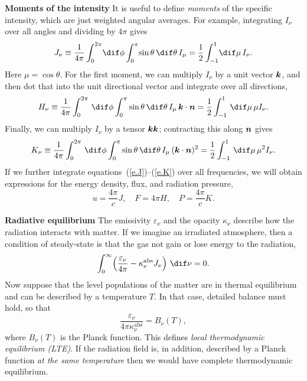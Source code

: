 \textbf{Moments of the intensity}
It is useful to define \emph{moments} of the specific intensity, which are just weighted angular averages.  For example, integrating $I_{\nu}$ over all angles and dividing by $4\pi$ gives
\begin{equation}\label{e.J}
J_{\nu} \equiv \frac{1}{4\pi}\int_{0}^{2\pi}\!\dif\phi\int_{0}^{\pi}\!\sin\theta\,\dif\theta\, I_{\mu} = \frac{1}{2}\int_{-1}^{1} \!\dif\mu \,I_{\nu}.
\end{equation}
Here $\mu = \cos\theta$. For the first moment, we can multiply $I_{\nu}$ by a unit vector $\boldsymbol{k}$, and then dot that into the unit directional vector and integrate over all directions,
\begin{equation}\label{e.H}
H_{\nu} \equiv \frac{1}{4\pi}\int_{0}^{2\pi}\,\dif\phi\int_{0}^{\pi}\sin\theta\,\dif\theta\, I_{\mu}\,\bvec{k}\cdot\bvec{n} = \frac{1}{2}\int_{-1}^{1} \,\dif\mu \,\mu I_{\nu}.
\end{equation}
Finally, we can multiply $I_{\nu}$ by a tensor $\boldsymbol{k}\boldsymbol{k}$; contracting this along $\boldsymbol{n}$ gives
\begin{equation}\label{e.K}
K_{\nu} \equiv \frac{1}{4\pi}\int_{0}^{2\pi}\,\dif\phi\int_{0}^{\pi}\sin\theta\,\dif\theta\, I_{\mu}\,(\bvec{k}\cdot\bvec{n})^{2} = \frac{1}{2}\int_{-1}^{1} \,\dif\mu \,\mu^{2} I_{\nu}.
\end{equation}
If we further integrate equations~(\ref{e.J})--(\ref{e.K}) over all frequencies, we will obtain expressions for the energy density, flux, and radiation pressure,
\begin{equation}\label{e.thermal}
u = \frac{4\pi}{c}J,\quad F = 4\pi H,\quad P = \frac{4\pi}{c}K.
\end{equation}

\textbf{Radiative equilibrium} The emissivity $\varepsilon_{\nu}$ and the opacity $\kappa_{\nu}$ describe how the radiation interacts with matter. If we imagine an irradiated atmosphere, then a condition of steady-state is that the gas not gain or lose energy to the radiation,
\begin{equation}\label{e.rad-equil}
\int_{0}^{\infty}\! \left(\frac{\varepsilon_{\nu}}{4\pi} - \kappa_{\nu}^{\mathrm{abs}} J_{\nu}\right)\,\dif\nu = 0.
\end{equation}
Now suppose that the level populations of the matter are in thermal equilibrium and can be described by a temperature $T$.  In that case, detailed balance must hold, so that
\begin{equation}\label{e.detail-balance}
\frac{\varepsilon_{\nu}}{4\pi\kappa_{\nu}^{\mathrm{abs}}} = B_{\nu}(T),
\end{equation}
where $B_{\nu}(T)$ is the Planck function. This defines \emph{local thermodynamic equilibrium (LTE)}. If the radiation field is, in addition, described by a Planck function \emph{at the same temperature} then we would have complete thermodynamic equilibrium.

